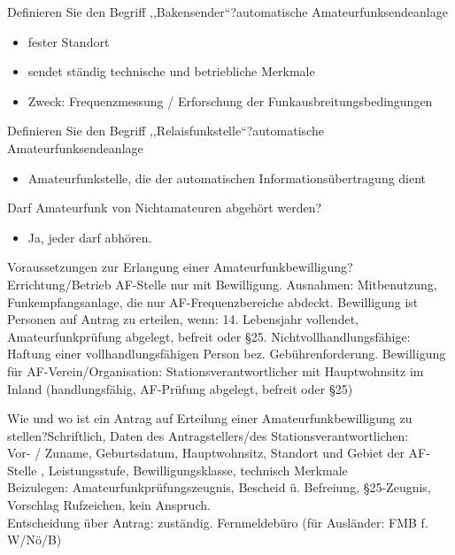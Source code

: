 \documentclass[avery5371,grid,frame,a4paper]{flashcards}
\newcommand{\card}[3]{
  \begin{flashcard}[{\chap} -- #1]{#2}#3\end{flashcard}
}
\begin{document}
\card{23}{Definieren Sie den Begriff ,,Bakensender``?}{automatische Amateurfunksendeanlage\begin{itemize}\itemsep1pt \item fester Standort \item sendet ständig technische und betriebliche Merkmale \item Zweck: Frequenzmessung / Erforschung der Funkausbreitungsbedingungen\end{itemize}}

\card{24}{Definieren Sie den Begriff ,,Relaisfunkstelle``?}{automatische Amateurfunksendeanlage\begin{itemize}\itemsep1pt \item Amateurfunkstelle, die der automatischen Informationsübertragung dient\end{itemize}}

\card{25}{ Darf Amateurfunk von Nichtamateuren abgehört werden?}{\begin{itemize}\itemsep1pt \item Ja, jeder darf abhören.\end{itemize}}

\card{26}{Voraussetzungen zur Erlangung einer Amateurfunkbewilligung?}{Errichtung/Betrieb AF-Stelle nur mit Bewilligung. Ausnahmen:  Mitbenutzung, Funkempfangsanlage, die nur AF-Frequenzbereiche abdeckt. Bewilligung ist Personen auf Antrag zu erteilen, wenn: 14. Lebensjahr vollendet, Amateurfunkprüfung abgelegt, befreit oder §25. Nichtvollhandlungsfähige: Haftung einer vollhandlungsfähigen Person bez. Gebührenforderung. Bewilligung für AF-Verein/Organisation: Stationsverantwortlicher mit Hauptwohnsitz im Inland (handlungsfähig, AF-Prüfung abgelegt, befreit oder §25)}

\card{27}{Wie und wo ist ein Antrag auf Erteilung einer Amateurfunkbewilligung zu stellen?}{Schriftlich, Daten des Antragstellers/des Stationsverantwortlichen:\\ Vor- / Zuname, Geburtsdatum, Hauptwohnsitz, Standort und Gebiet der AF-Stelle , Leistungsstufe, Bewilligungsklasse, technisch Merkmale \\ Beizulegen: Amateurfunkprüfungszeugnis, Bescheid ü. Befreiung, §25-Zeugnis, Vorschlag Rufzeichen, kein Anspruch. \\ Entscheidung über Antrag: zuständig. Fernmeldebüro (für Ausländer: FMB f. W/Nö/B)}

\end{document}
